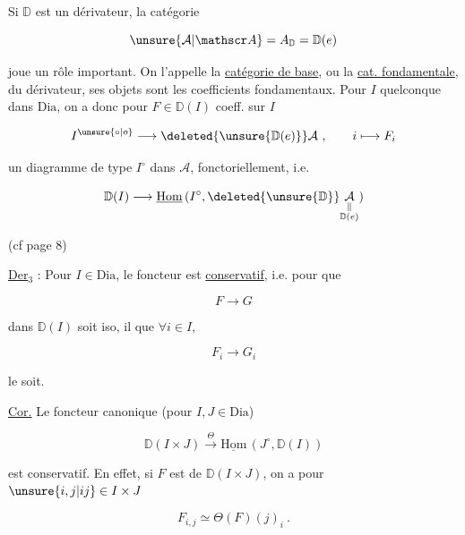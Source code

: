 
Si $\mathbb D$ est un dérivateur, la catégorie

\[
\unsure{\mathcal A|\mathscr A}=A_{\mathbb D}=\mathbb D(e)
\]

joue un rôle important. On l'appelle la \uline{catégorie de base}, ou la \uline{cat. fondamentale}, du dérivateur, ses objets sont les coefficients fondamentaux. Pour $I$ quelconque dans $\mathrm{Dia}$, on a donc pour $F\in\mathbb D(I)$ coeff. sur $I$

\[
I^{\unsure{\circ|o}}\longrightarrow\deleted{\unsure{\mathbb D(e)}}\mathcal A\ ,\qquad i\longmapsto F_{i}
\]

un diagramme de type $I^{\circ}$ dans $\mathcal A$, fonctoriellement, i.e.

\[
\mathbb D(I)\longrightarrow\underline{\mathrm{Hom}}\,(I^{\circ},\deleted{\unsure{\mathbb D}}\underset{\substack{\Vert\\\mathbb D(e)}}{\mathcal A})
\]

(cf page 8)

\uline{Der}$_3$ : Pour  $I\in\mathrm{Dia}$, le foncteur est \uline{conservatif}, i.e. pour que


\[
F\longrightarrow G
\]

dans $\mathbb D(I)$ soit iso, il  que $\forall i\in I$,

\[
F_{i}\longrightarrow G_{i}
\]

le soit.

\uline{Cor.} Le foncteur canonique (pour $I,J\in\mathrm{Dia}$)

\[
\mathbb D(I\times J)\overset{\Theta}{\longrightarrow}\underline{\mathrm{Hom}}\,(J^{\circ},\mathbb D(I))
\]

est conservatif. En effet, si $F$ est de $\mathbb D(I\times J)$, on a pour $\unsure{i,j|ij}\in I\times J$

\[
F_{i,j}\simeq\Theta(F)(j)_{i}\ .
\]

